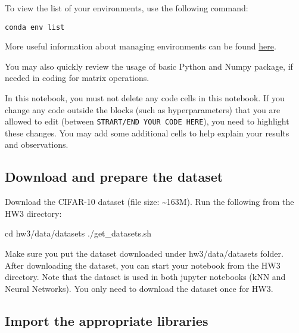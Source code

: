 \documentclass[11pt]{article}
\newenvironment{Shaded}{}{}
\newcommand{\NormalTok}[1]{{#1}}
\newcommand{\BuiltInTok}[1]{{#1}}
\newcommand{\ExtensionTok}[1]{{#1}}
\begin{document}
To view the list of your environments, use the following command:

\begin{verbatim}
conda env list
\end{verbatim}

More useful information about managing environments can be found
\href{https://docs.conda.io/projects/conda/en/latest/user-guide/tasks/manage-environments.html}{here}.

You may also quickly review the usage of basic Python and Numpy package,
if needed in coding for matrix operations.

In this notebook, you must not delete any code cells in this notebook.
If you change any code outside the blocks (such as hyperparameters) that
you are allowed to edit (between \texttt{STRART/END\ YOUR\ CODE\ HERE}),
you need to highlight these changes. You may add some additional cells
to help explain your results and observations.

    \hypertarget{download-and-prepare-the-dataset}{%
\subsection{Download and prepare the
dataset}\label{download-and-prepare-the-dataset}}

Download the CIFAR-10 dataset (file size: \textasciitilde163M). Run the
following from the HW3 directory:

\begin{Shaded}
\begin{Highlighting}[]
\BuiltInTok{cd}\NormalTok{ hw3/data/datasets }
\ExtensionTok{./get\_datasets.sh}
\end{Highlighting}
\end{Shaded}

Make sure you put the dataset downloaded under hw3/data/datasets folder.
After downloading the dataset, you can start your notebook from the HW3
directory. Note that the dataset is used in both jupyter notebooks (kNN
and Neural Networks). You only need to download the dataset once for
HW3.

    \hypertarget{import-the-appropriate-libraries}{%
\subsection{Import the appropriate
libraries}\label{import-the-appropriate-libraries}}
\end{document}

